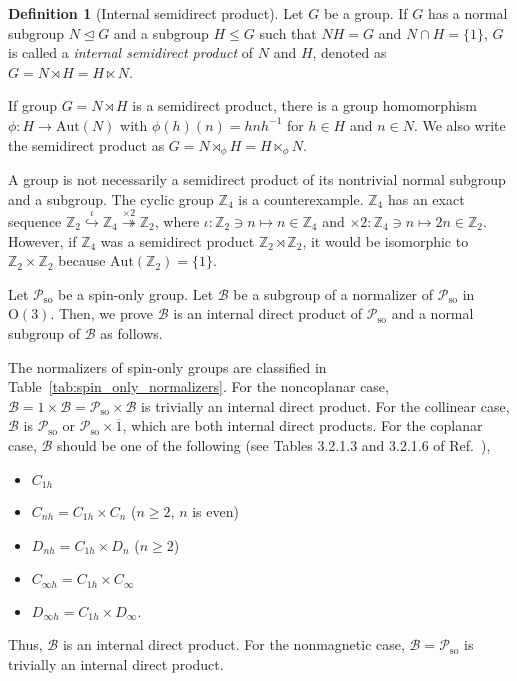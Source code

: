 \documentclass[a4paper, 11pt]{article}
\theoremstyle{definition}
\newcommand{\term}[1]{\textit{#1}}
\newtheorem{definition}[theorem]{Definition}
\begin{document}
\begin{screen}
  \begin{definition}[Internal semidirect product]
    Let $G$ be a group.
    If $G$ has a normal subgroup $N \trianglelefteq G$ and a subgroup $H \leq G$ such that $NH = G$ and $N \cap H = \{ 1 \}$, $G$ is called a \term{internal semidirect product} of $N$ and $H$, denoted as $G = N \rtimes H = H \ltimes N$.
  \end{definition}
\end{screen}

If group $G = N \rtimes H$ is a semidirect product, there is a group homomorphism $\phi: H \to \mathrm{Aut}(N)$ with $\phi(h)(n) = h n h^{-1}$ for $h \in H$ and $n \in N$.
We also write the semidirect product as $G = N \rtimes_{\phi} H = H \ltimes_{\phi} N$.

A group is not necessarily a semidirect product of its nontrivial normal subgroup and a subgroup.
The cyclic group $\mathbb{Z}_{4}$ is a counterexample.
$\mathbb{Z}_{4}$ has an exact sequence $\mathbb{Z}_{2} \overset{\iota}{\hookrightarrow} \mathbb{Z}_{4} \overset{\times 2}{\twoheadrightarrow} \mathbb{Z}_{2}$, where $\iota: \mathbb{Z}_{2} \ni n \mapsto n \in \mathbb{Z}_{4}$ and $\times 2: \mathbb{Z}_{4} \ni n \mapsto 2n \in \mathbb{Z}_{2}$.
However, if $\mathbb{Z}_{4}$ was a semidirect product $\mathbb{Z}_{2} \rtimes \mathbb{Z}_{2}$, it would be isomorphic to $\mathbb{Z}_{2} \times \mathbb{Z}_{2}$ because $\mathrm{Aut}(\mathbb{Z}_{2}) = \{ 1 \}$.

Let $\mathcal{P}_{\mathrm{so}}$ be a spin-only group.
Let $\mathcal{B}$ be a subgroup of a normalizer of $\mathcal{P}_{\mathrm{so}}$ in $\mathrm{O}(3)$.
Then, we prove $\mathcal{B}$ is an internal direct product of $\mathcal{P}_{\mathrm{so}}$ and a normal subgroup of $\mathcal{B}$ as follows.

The normalizers of spin-only groups are classified in Table~\ref{tab:spin_only_normalizers}.
For the noncoplanar case, $\mathcal{B} = 1 \times \mathcal{B} = \mathcal{P}_{\mathrm{so}} \times \mathcal{B}$ is trivially an internal direct product.
For the collinear case, $\mathcal{B}$ is $\mathcal{P}_{\mathrm{so}}$ or $\mathcal{P}_{\mathrm{so}} \times \overline{1}$, which are both internal direct products.
For the coplanar case, $\mathcal{B}$ should be one of the following (see Tables 3.2.1.3 and 3.2.1.6 of Ref.~\cite{hahn2016point}),
\begin{itemize}
  \item $C_{1h}$
  \item $C_{nh} = C_{1h} \times C_{n}$ ($n \geq 2$, $n$ is even)
  \item $D_{nh} = C_{1h} \times D_{n}$ ($n \geq 2$)
  \item $C_{\infty h} = C_{1h} \times C_{\infty}$
  \item $D_{\infty h} = C_{1h} \times D_{\infty}$.
\end{itemize}
Thus, $\mathcal{B}$ is an internal direct product.
For the nonmagnetic case, $\mathcal{B} = \mathcal{P}_{\mathrm{so}}$ is trivially an internal direct product.
\end{document}
